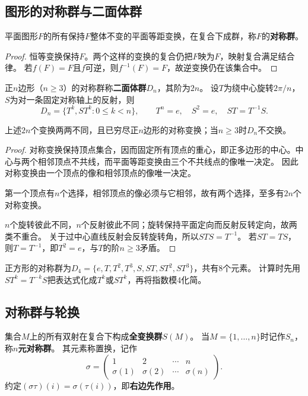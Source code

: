 \subsection*{图形的对称群与二面体群}
\begin{proposition}
\label{p2:concept:c1-l156}平面图形$F$的所有保持$F$整体不变的平面等距变换，在复合下成群，称$F$的\textbf{对称群}。
\end{proposition}
\begin{proof}
恒等变换保持$F$。两个这样的变换的复合仍把$F$映为$F$，映射复合满足结合律。
若$f(F)=F$且$f$可逆，则$f^{-1}(F)=F$，故逆变换仍在该集合中。
\end{proof}

\begin{definition}
\label{p2:concept:c1-l164}正$n$边形（$n\geq3$）的对称群称\textbf{二面体群}$D_n$，其阶为$2n$。
设$T$为绕中心旋转$2\pi/n$，$S$为对一条固定对称轴上的反射，则
\[
D_n=\{T^k,ST^k:0\leq k<n\},\qquad T^n=e,\quad S^2=e,\quad ST=T^{-1}S.
\]
\end{definition}

\begin{proposition}
上述$2n$个变换两两不同，且已穷尽正$n$边形的对称变换；当$n\geq3$时$D_n$不交换。
\end{proposition}
\begin{proof}
对称变换保持顶点集合，因而固定所有顶点的重心，即正多边形的中心。中心与两个相邻顶点不共线，而平面等距变换由三个不共线点的像唯一决定。
因此对称变换由一个顶点的像和相邻顶点的像唯一决定。

第一个顶点有$n$个选择，相邻顶点的像必须与它相邻，故有两个选择，至多有$2n$个对称变换。

$n$个旋转彼此不同，$n$个反射彼此不同；旋转保持平面定向而反射反转定向，故两类不重合。
关于过中心直线反射会反转旋转角，所以$STS=T^{-1}$。
若$ST=TS$，则$T=T^{-1}$，即$T^2=e$，与$T$的阶$n\geq3$矛盾。
\end{proof}

\begin{example}
正方形的对称群为$D_4=\{e,T,T^2,T^3,S,ST,ST^2,ST^3\}$，共有8个元素。
计算时先用$ST^k=T^{-k}S$把表达式化成$T^k$或$ST^k$，再将指数模4化简。
\end{example}

\subsection*{对称群与轮换}
\begin{definition}
\label{p2:concept:c1-l192}集合$M$上的所有双射在复合下构成\textbf{全变换群}$S(M)$。
\label{p2:concept:c1-l193}当$M=\{1,\ldots,n\}$时记作$S_n$，称\textbf{$n$元对称群}。
\label{p2:concept:c1-l194}其元素称置换，记作
\[
\sigma=\begin{pmatrix}1&2&\cdots&n\\\sigma(1)&\sigma(2)&\cdots&\sigma(n)\end{pmatrix}.
\]
约定$(\sigma\tau)(i)=\sigma(\tau(i))$，即\textbf{右边先作用}。
\end{definition}

